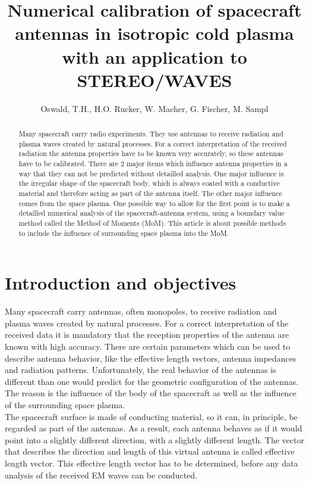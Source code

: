 \documentclass[a4paper,11pt]{article}
\title{Numerical calibration of spacecraft antennas in isotropic cold plasma with an application to STEREO/WAVES}
\author{Oswald, T.H., H.O. Rucker, W. Macher, G. Fischer, M. Sampl}
\begin{document}
\maketitle

\begin{abstract}
Many spacecraft carry radio experiments. They use antennas to receive radiation and plasma waves created by natural processes. For a correct interpretation of the received radiation the antenna properties have to be known very accurately, so these antennas have to be calibrated. There are 2 major items which influence antenna properties in a way that they can not be predicted without detailled analysis. One major influence is the irregular shape of the spacecraft body, which is always coated with a conductive material and therefore acting as part of the antenna itself. The other major influence comes from the space plasma. One possible way to allow for the first point is to make a detailled numerical analysis of the spacecraft-antenna system, using a boundary value method called the Method of Moments (MoM). This article is about possible methods to include the influence of surrounding space plasma into the MoM.
\end{abstract}

\section{Introduction and objectives}
Many spacecraft carry antennas, often monopoles, to receive radiation and plasma waves created by natural processes. For a correct interpretation of the received data it is mandatory that the reception properties of the antenna are known with high accuracy. There are certain parameters which can be used to describe antenna behavior, like the effective length vectors, antenna impedances and radiation patterns. Unfortunately, the real behavior of the antennas is different than one would predict for the geometric configuration of the antennas. The reason is the influence of the body of the spacecraft as well as the influence of the surrounding space plasma.\\

The spacecraft surface is made of conducting material, so it can, in principle, be regarded as part of the antennas. As a result, each antenna behaves as if it would point into a slightly different direction, with a slightly different length. The vector that describes the direction and length of this virtual antenna is called effective length vector. This effective length vector has to be determined, before any data analysis of the received EM waves can be conducted.\\
\end{document}
